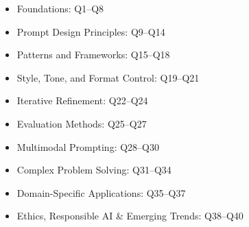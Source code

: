 \documentclass[11pt]{article}
\begin{document}
\begin{itemize}
    \item Foundations: Q1--Q8
    \item Prompt Design Principles: Q9--Q14
    \item Patterns and Frameworks: Q15--Q18
    \item Style, Tone, and Format Control: Q19--Q21
    \item Iterative Refinement: Q22--Q24
    \item Evaluation Methods: Q25--Q27
    \item Multimodal Prompting: Q28--Q30
    \item Complex Problem Solving: Q31--Q34
    \item Domain-Specific Applications: Q35--Q37
    \item Ethics, Responsible AI \& Emerging Trends: Q38--Q40
\end{itemize}
\end{document}
